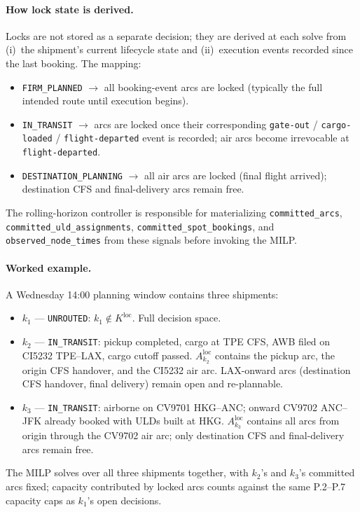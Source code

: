 \documentclass[11pt,a4paper]{article}
\theoremstyle{definition}
\begin{document}
\paragraph{How lock state is derived.}
Locks are not stored as a separate decision; they are derived at each solve from
(i)~the shipment's current lifecycle state and (ii)~execution events recorded since
the last booking. The mapping:
\begin{itemize}[noitemsep]
  \item \texttt{FIRM\_PLANNED} $\to$ all booking-event arcs are locked (typically the
        full intended route until execution begins).
  \item \texttt{IN\_TRANSIT} $\to$ arcs are locked once their corresponding
        \texttt{gate-out} / \texttt{cargo-loaded} / \texttt{flight-departed} event is
        recorded; air arcs become irrevocable at \texttt{flight-departed}.
  \item \texttt{DESTINATION\_PLANNING} $\to$ all air arcs are locked (final flight
        arrived); destination CFS and final-delivery arcs remain free.
\end{itemize}
The rolling-horizon controller is responsible for materializing
\texttt{committed\_arcs}, \texttt{committed\_uld\_assignments},
\texttt{committed\_spot\_bookings}, and \texttt{observed\_node\_times} from these
signals before invoking the MILP.

\paragraph{Worked example.}
A Wednesday 14:00 planning window contains three shipments:
\begin{itemize}[noitemsep]
  \item $k_1$ --- \texttt{UNROUTED}: $k_1 \notin K^{\text{loc}}$. Full decision space.
  \item $k_2$ --- \texttt{IN\_TRANSIT}: pickup completed, cargo at TPE CFS, AWB filed
        on CI5232 TPE--LAX, cargo cutoff passed. $A_{k_2}^{\text{loc}}$ contains the
        pickup arc, the origin CFS handover, and the CI5232 air arc. LAX-onward arcs
        (destination CFS handover, final delivery) remain open and re-plannable.
  \item $k_3$ --- \texttt{IN\_TRANSIT}: airborne on CV9701 HKG--ANC; onward CV9702
        ANC--JFK already booked with ULDs built at HKG. $A_{k_3}^{\text{loc}}$
        contains all arcs from origin through the CV9702 air arc; only destination
        CFS and final-delivery arcs remain free.
\end{itemize}
The MILP solves over all three shipments together, with $k_2$'s and $k_3$'s
committed arcs fixed; capacity contributed by locked arcs counts against the same
P.2--P.7 capacity caps as $k_1$'s open decisions.
\end{document}
